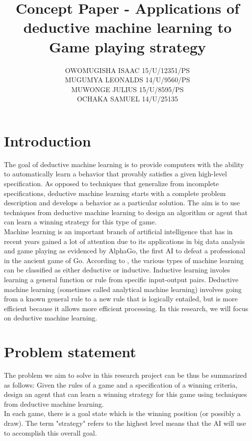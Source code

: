 \documentclass[11pt]{article}
\title{Concept Paper - Applications of deductive machine learning to Game playing strategy}
\author{OWOMUGISHA ISAAC \hspace{1cm}15/U/12351/PS\\ MUGUMYA LEONALDS \hspace{1cm} 14/U/9560/PS\\MUWONGE JULIUS \hspace{1cm} 15/U/8595/PS \\ OCHAKA SAMUEL \hspace{1cm} 14/U/25135}
\date{}
\begin{document}
\maketitle

\section{Introduction}
The goal of deductive machine learning is to provide computers with the ability to automatically learn a behavior that provably satisfies a given high-level specification. As opposed to techniques that generalize from incomplete specifications, deductive machine learning starts with a complete problem description and develops a behavior as a particular solution. The aim is to use techniques from deductive machine learning to design an algorithm or agent that can learn a winning strategy for this type of game.\\

Machine learning is an important branch of artificial intelligence that has in recent years gained a lot of attention due to its applications in big data analysis and game playing as evidenced by AlphaGo, the first AI to defeat a professional in the ancient game of Go.
According to \cite{russell2010artificial}, the various types of machine learning can be classified as either deductive or inductive. Inductive learning involes learning a general function or rule from specific input-output pairs. Deductive machine learning (sometimes called analytical machine learning) involves going from a known general rule to a new rule that is logically entailed, but is more efficient because it allows more efficient processing. In this research, we will focus on deductive machine learning.\\

\section{Problem statement}
The problem we aim to solve in this research project can be thus be summarized as follows: Given the rules of a game and a specification of a winning criteria, design an agent that can learn a winning strategy for this game using techniques from deductive machine learning.\\

In each game, there is a goal state which is the winning position (or possibly a draw). The term "strategy" refers to the highest level means that the AI will use to accomplish this overall goal.
\end{document}
